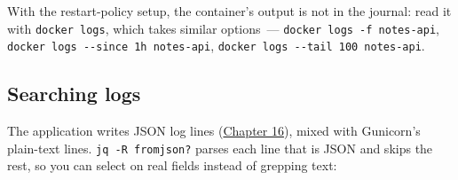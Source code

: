 \noindent{}With the restart-policy setup, the container's output is not in the journal: read it with \texttt{docker\ logs}, which takes similar options~--- \texttt{docker\ logs\ -}\allowbreak{}\texttt{f\ notes-}\allowbreak{}\texttt{api}, \texttt{docker\ logs\ -}\allowbreak{}\texttt{-}\allowbreak{}\texttt{since\ 1h\ notes-}\allowbreak{}\texttt{api}, \texttt{docker\ logs\ -}\allowbreak{}\texttt{-}\allowbreak{}\texttt{tail\ 100\ notes-}\allowbreak{}\texttt{api}.

\subsection*{Searching logs}\label{25-process-management:searching-logs}

The application writes JSON log lines (\hyperref[ch:16-logging-error-handling]{Chapter 16}), mixed with Gunicorn's plain-text lines. \texttt{jq\ -R\ \textquotesingle{}fromjson?\textquotesingle{}} parses each line that is JSON and skips the rest, so you can select on real fields instead of grepping text:

